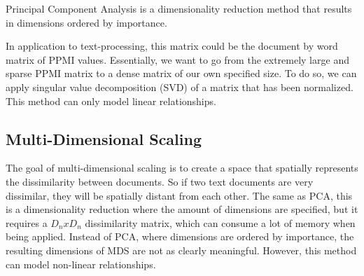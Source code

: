 Principal Component Analysis is a dimensionality reduction method that results in dimensions ordered by importance. 



In application to text-processing, this matrix could be the document by word matrix of PPMI values. Essentially, we want to go from the extremely large and sparse PPMI matrix to a dense matrix of our own specified size. To do so, we can apply singular value decomposition (SVD) of a matrix that has been normalized. This method can only model linear relationships.







\subsection{Multi-Dimensional Scaling}

The goal of multi-dimensional scaling is to create a space that spatially represents the dissimilarity between documents. So if two text documents are very dissimilar, they will be spatially distant from each other. The same as PCA, this is a dimensionality reduction where the amount of dimensions are specified, but it requires a $D_n x D_n$ dissimilarity matrix, which can consume a lot of memory when being applied. Instead of PCA, where dimensions are ordered by importance, the resulting dimensions of MDS are not as clearly meaningful. However, this method can model non-linear relationships.

